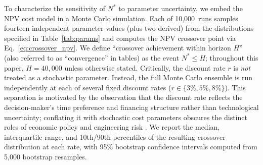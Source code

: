 \documentclass[preprint,12pt]{elsarticle}
\begin{document}
To characterize the sensitivity of $N^*$ to parameter uncertainty, we embed the NPV cost model in a Monte Carlo simulation. Each of 10{,}000~runs samples fourteen independent parameter values (plus two derived) from the distributions specified in Table~\ref{tab:params} and computes the NPV crossover point via Eq.~\ref{eq:crossover_npv}. We define ``crossover achievement within horizon $H$'' (also referred to as ``convergence'' in tables) as the event $N^* \leq H$; throughout this paper, $H = 40{,}000$ unless otherwise stated. Critically, the discount rate $r$ is \emph{not} treated as a stochastic parameter. Instead, the full Monte Carlo ensemble is run independently at each of several fixed discount rates ($r \in \{3\%, 5\%, 8\%\}$). This separation is motivated by the observation that the discount rate reflects the decision-maker's time preference and financing structure rather than technological uncertainty; conflating it with stochastic cost parameters obscures the distinct roles of economic policy and engineering risk \cite{arrow2014}. We report the median, interquartile range, and 10th/90th percentiles of the resulting crossover distribution at each rate, with 95\% bootstrap confidence intervals computed from 5{,}000 bootstrap resamples.
\end{document}
